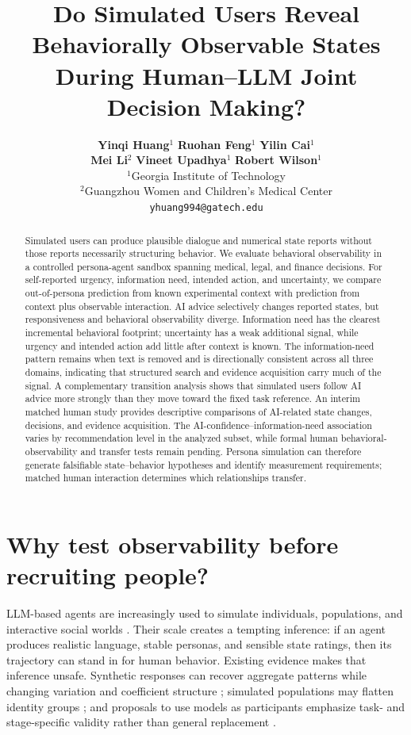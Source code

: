 \documentclass{article}
\title{Do Simulated Users Reveal Behaviorally Observable States During Human--LLM Joint Decision Making?}
\author{
\textbf{Yinqi Huang}$^{1}$ \quad \textbf{Ruohan Feng}$^{1}$ \quad \textbf{Yilin Cai}$^{1}$\\
\textbf{Mei Li}$^{2}$ \quad \textbf{Vineet Upadhya}$^{1}$ \quad \textbf{Robert Wilson}$^{1}$\\[0.5em]
$^{1}$Georgia Institute of Technology\\
$^{2}$Guangzhou Women and Children's Medical Center\\
\texttt{yhuang994@gatech.edu}
}
\begin{document}
\maketitle

\begin{abstract}
Simulated users can produce plausible dialogue and numerical state reports without those reports necessarily structuring behavior. We evaluate behavioral observability in a controlled persona-agent sandbox spanning medical, legal, and finance decisions. For self-reported urgency, information need, intended action, and uncertainty, we compare out-of-persona prediction from known experimental context with prediction from context plus observable interaction. AI advice selectively changes reported states, but responsiveness and behavioral observability diverge. Information need has the clearest incremental behavioral footprint; uncertainty has a weak additional signal, while urgency and intended action add little after context is known. The information-need pattern remains when text is removed and is directionally consistent across all three domains, indicating that structured search and evidence acquisition carry much of the signal. A complementary transition analysis shows that simulated users follow AI advice more strongly than they move toward the fixed task reference. An interim matched human study provides descriptive comparisons of AI-related state changes, decisions, and evidence acquisition. The AI-confidence--information-need association varies by recommendation level in the analyzed subset, while formal human behavioral-observability and transfer tests remain pending. Persona simulation can therefore generate falsifiable state--behavior hypotheses and identify measurement requirements; matched human interaction determines which relationships transfer.
\end{abstract}


\section{Why test observability before recruiting people?}


LLM-based agents are increasingly used to simulate individuals, populations, and interactive social worlds \citep{aher2023using,park2023generative,argyle2023out,horton2023homo,li2026matraix}. Their scale creates a tempting inference: if an agent produces realistic language, stable personas, and sensible state ratings, then its trajectory can stand in for human behavior. Existing evidence makes that inference unsafe. Synthetic responses can recover aggregate patterns while changing variation and coefficient structure \citep{bisbee2024synthetic}; simulated populations may flatten identity groups \citep{wang2025flatten}; and proposals to use models as participants emphasize task- and stage-specific validity rather than general replacement \citep{dillion2023replace}.
\end{document}

